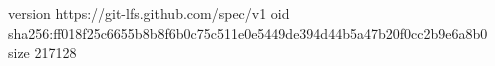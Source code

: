 version https://git-lfs.github.com/spec/v1
oid sha256:ff018f25c6655b8b8f6b0c75c511e0e5449de394d44b5a47b20f0cc2b9e6a8b0
size 217128
